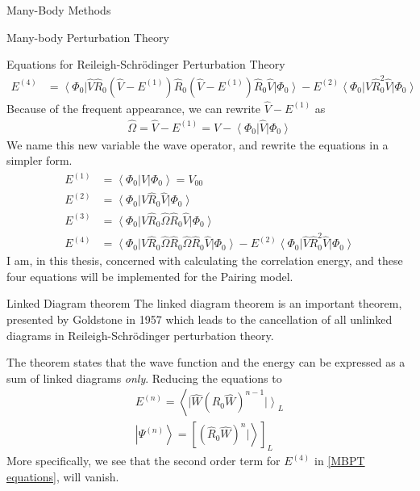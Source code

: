 \documentclass[twoside,english]{uiofysmaster}
\begin{document}
\begin{chapter}{Many-Body Methods}
\begin{section}{Many-body Perturbation Theory}
\begin{subsection}{Equations for Reileigh-Schr\"{o}dinger Perturbation Theory}
\begin{align*}
	 			E^{(4)} &= \left< \Phi_0 \right| \hat V \hat R_0 (\hat V - E^{(1)})  \hat R_0 (\hat V - E^{(1)}) \hat R_0 \hat V \left| \Phi_0 \right> 
	 					- E^{(2)} \left< \Phi_0 \right| \hat V \hat R_0^2 \hat V \left| \Phi_0 \right>
	  		\end{align*}
	  		Because of the frequent appearance, we can rewrite $\hat V - E^{(1)}$ as
	  		\begin{align}
	  			\hat \Omega = \hat V - E^{(1)} = \hat V - \left< \Phi_0 \right| \hat V \left| \Phi_0 \right>
	  		\end{align}
	  		We name this new variable the wave operator, and rewrite the equations in a simpler form. 
	  		\begin{align*}
	 			E^{(1)} &= \left< \Phi_0 \right| \hat V \left| \Phi_0 \right>  = V_{00}\\
	 			E^{(2)} &= \left< \Phi_0 \right| \hat V \hat R_0 \hat V \left| \Phi_0 \right> \\
	 			E^{(3)} &= \left< \Phi_0 \right| \hat V \hat R_0 \hat \Omega \hat R_0 \hat V \left| \Phi_0 \right> \\
	 			E^{(4)} &= \left< \Phi_0 \right| \hat V \hat R_0 \hat \Omega  \hat R_0 \hat \Omega \hat R_0 \hat V \left| \Phi_0 \right> 
	 					- E^{(2)} \left< \Phi_0 \right| \hat V \hat R_0^2 \hat V \left| \Phi_0 \right>
	 			\label{MBPT equations}
	  		\end{align*}
	  		I am, in this thesis, concerned with calculating the correlation energy, and these four equations will be implemented for the Pairing model. 
	 	\end{subsection}
	\end{section}

	\begin{section}{Linked Diagram theorem}
		The linked diagram theorem is an important theorem, presented by Goldstone in 1957 \cite{ShavittAndBartlett,Goldstone} which leads to the cancellation of all unlinked diagrams in Reileigh-Schr\"{o}dinger perturbation theory.

		The theorem states that the wave function and the energy can be expressed as a sum of linked diagrams \textit{only}. Reducing the equations to 
		\begin{align}
			E^{(n)} = \left< \right. | \hat W (\hat R_0 \hat W)^{n-1} \left. | \right>_L \\
			\left| \Psi^{(n)} \right> = \left[ (\hat R_0 \hat W)^n |\left.\right>  \right]_L
		\end{align}
		More specifically, we see that the second order term for $E^{(4)}$ in \ref{MBPT equations}, will vanish. 


\end{section}
\end{chapter}
\end{document}
